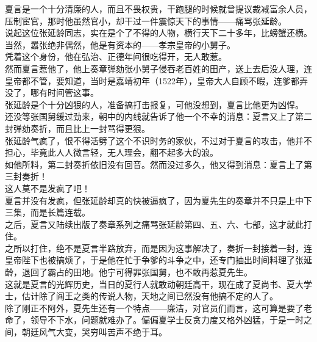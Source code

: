 \begin{multicols}{\theparacolNo}
夏言是一个十分清廉的人，而且不畏权贵，干跑腿的时候就曾提议裁减富余人员，压制宦官，那时他虽然官小，却干过一件震惊天下的事情——痛骂张延龄。\\

说起这位张延龄同志，实在是个了不得的人物，横行天下二十多年，比螃蟹还横。当然，嚣张绝非偶然，他是有资本的——孝宗皇帝的小舅子。\\

凭着这个身份，他在弘治、正德年间很吃得开，无人敢惹。\\

然而夏言惹他了，他上奏章弹劾张小舅子侵吞老百姓的田产，送上去后没人理，连皇帝都不管，要知道，当时是嘉靖初年（1522年），皇帝大人自顾不暇，连爹都弄没了，哪有时间管这事。\\

张延龄是个十分凶狠的人，准备搞打击报复，可他没想到，夏言比他更为凶悍。\\

还没等张国舅缓过劲来，朝中的内线就告诉了他一个不幸的消息：夏言又上了第二封弹劾奏折，而且比上一封骂得更狠。\\

张延龄气疯了，恨不得活劈了这个不识时务的家伙，不过对于夏言的攻击，他并不担心，毕竟此人人微言轻，无人理会，翻不起多大的浪。\\

如他所料，第二封奏折依旧没有回音。然而没过多久，他又得到消息：夏言上了第三封奏折！\\

这人莫不是发疯了吧！\\

夏言并没有发疯，但张延龄却真的快被逼疯了，因为夏先生的奏章并不只是上中下三集，而是长篇连载。\\

之后，夏言又陆续出版了奏章系列之痛骂张延龄第四、五、六、七部，这才就此打住。\\

之所以打住，绝不是夏言半路放弃，而是因为这事解决了，奏折一封接着一封，连皇帝陛下也被搞烦了，于是他在忙于争爹的斗争之中，还专门抽出时间料理了张延龄，退回了霸占的田地。他宁可得罪张国舅，也不敢再惹夏先生。\\

这就是夏言的光辉历史，当日的夏行人就敢动朝廷高干，现在成了夏尚书、夏大学士，估计除了阎王之类的传说人物，天地之间已然没有他搞不定的人了。\\

除了刚正不阿外，夏先生还有一个特点——廉洁，对官员们而言，这可算是要了老命了，领导不下水，问题就难办了。偏偏夏学士反贪力度又格外凶猛，于是一时之间，朝廷风气大变，哭穷叫苦声不绝于耳。\\


\end{multicols}
